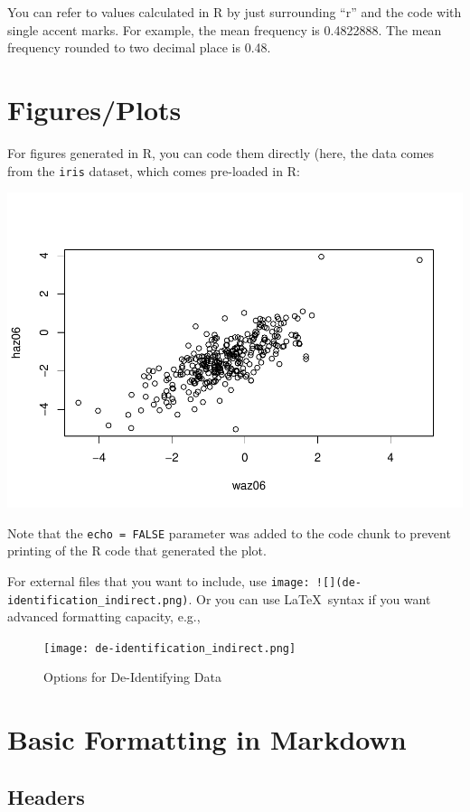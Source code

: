 \documentclass[11pt,]{article}
\begin{document}
You can refer to values calculated in R by just surrounding ``r'' and
the code with single accent marks. For example, the mean frequency is
0.4822888. The mean frequency rounded to two decimal place is 0.48.

\section{Figures/Plots}\label{figuresplots}

For figures generated in R, you can code them directly (here, the data
comes from the \texttt{iris} dataset, which comes pre-loaded in R:

\includegraphics{Rmarkdown_advanced_files/figure-latex/unnamed-chunk-5-1.pdf}

Note that the \texttt{echo\ =\ FALSE} parameter was added to the code
chunk to prevent printing of the R code that generated the plot.

For external files that you want to include, use
\texttt{image:\ !{[}{]}(de-identification\_indirect.png)}. Or you can
use \LaTeX~syntax if you want advanced formatting capacity, e.g.,

\begin{figure}[H]
  \centering
  \caption{Options for De-Identifying Data}
  \texttt{[image: de-identification\_indirect.png]}
\end{figure}

\section{Basic Formatting in
Markdown}\label{basic-formatting-in-markdown}

\subsection{Headers}\label{headers}
\end{document}
